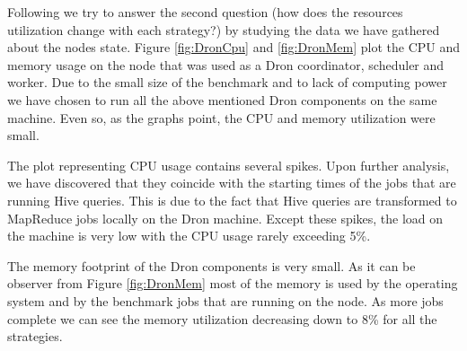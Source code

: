 \documentclass[11pt,a4paper,twoside]{report}
\begin{document}
Following we try to answer the second question (how does the resources utilization change with each strategy?) by studying the data we have gathered about the nodes state. Figure \ref{fig:DronCpu} and \ref{fig:DronMem} plot the CPU and memory usage on the node that was used as a Dron coordinator, scheduler and worker. Due to the small size of the benchmark and to lack of computing power we have chosen to run all the above mentioned Dron components on the same machine. Even so, as the graphs point, the CPU and memory utilization were small. 


The plot representing CPU usage contains several spikes. Upon further analysis, we have discovered that they coincide with the starting times of the jobs that are running Hive queries. This is due to the fact that Hive queries are transformed to MapReduce jobs locally on the Dron machine. Except these spikes, the load on the machine is very low with the CPU usage rarely exceeding 5\%.


The memory footprint of the Dron components is very small. As it can be observer from Figure \ref{fig:DronMem} most of the memory is used by the operating system and by the benchmark jobs that are running on the node. As more jobs complete we can see the memory utilization decreasing down to 8\% for all the strategies.
\end{document}
